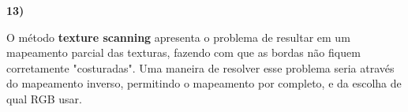 \textbf{13)} 

O método \textbf{texture scanning} apresenta o problema de resultar 
em um mapeamento parcial das texturas, fazendo com que as bordas 
não fiquem corretamente "costuradas". Uma maneira de resolver esse 
problema seria através do mapeamento inverso, permitindo o mapeamento 
por completo, e da escolha de qual RGB usar.

